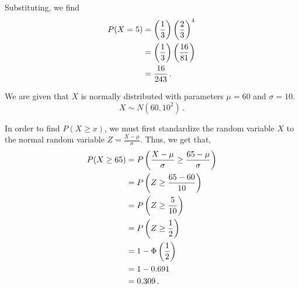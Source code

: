 \begin{subquestions}
\begin{subsubquestions}
Substituting, we find
\begin{align}
	P(X=5) & = \left(\frac{1}{3} \right) \left(\frac{2}{3} \right)^4 \nonumber \\
	       & = \left(\frac{1}{3} \right) \left(\frac{16}{81} \right) \nonumber \\
           & = \frac{16}{243} \,. 
\end{align}

\end{subsubquestions}


\subquestion

We are given that
 $X$ is normally distributed with parameters $\mu = 60$ and $\sigma = 10$.
 \begin{equation}
 	X \sim N(60,10^2)\,.
 \end{equation}
\begin{subsubquestions}
	
\subsubquestion

In order to find $P(X \geq x)$, we must first standardize the random variable $X$ to the normal random variable $Z = \frac{X-\mu}{\sigma}$. Thus, we get that,
\begin{align}
	P(X \geq 65) & = P\left( \frac{X-\mu}{\sigma} \geq \frac{65-\mu}{\sigma} \right) \nonumber \\
	             & = P\left(Z \geq \frac{65-60}{10} \right) \nonumber \\
	             & = P\left(Z \geq \frac{5}{10} \right) \nonumber \\
	             & = P\left(Z \geq \frac{1}{2} \right) \nonumber \\
	             & = 1 - \Phi\left(\frac{1}{2} \right) \nonumber \\
	             & = 1 - 0.691 \nonumber \\
	             & = 0.309 \,.	
\end{align}


\subsubquestion


\end{subsubquestions}
\end{subquestions}

